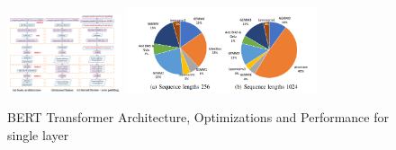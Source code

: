 \documentclass{article}
\begin{document}
\begin{figure}[h]
    \centering
    \includegraphics[width=0.3\textwidth]{architecture.png}
    \includegraphics[width=0.5\textwidth]{performance.png}
    \caption{BERT Transformer Architecture, Optimizations and Performance for single layer}
    \label{fig:architecture}
    \vspace{-0.5cm}
\end{figure}
\end{document}
